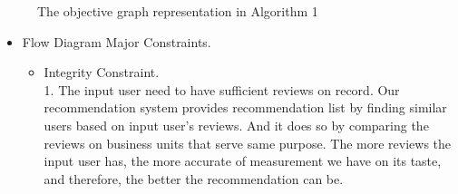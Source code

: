 \begin{itemize}
\begin{figure}[h] \label{fig:representation_alg_1}
	\begin{center}
		\advance\rightskip-1cm
		{}
		\caption{The objective graph representation in Algorithm 1}
	\end{center}
\end{figure}

\end{itemize}

\begin{itemize} 
\item{  Flow Diagram Major Constraints.}
\begin{itemize} 
\item{ Integrity Constraint. }
\\1. The input user need to have sufficient  reviews on record. Our recommendation system provides recommendation list by finding similar users based on input user's reviews. And it does so by comparing the reviews on business units that serve same purpose. The more reviews the input user has, the more accurate of measurement we have on its taste, and therefore, the better the recommendation can be.
\end{itemize}
\end{itemize}
